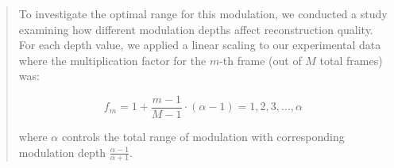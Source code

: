 \documentclass[12pt]{article}
\newenvironment{ourresponse}
    {\begin{tcolorbox}[width=\linewidth,breakable,enhanced,colback=gray!5,colframe=responsecolor!50,title=Response,left=5pt,right=5pt]}
    {\end{tcolorbox}}
\begin{document}
\begin{enumerate}[label=\arabic*.]
\begin{ourresponse}
\begin{quote}
To investigate the optimal range for this modulation, we conducted a study examining how different modulation depths affect reconstruction quality. For each depth value, we applied a linear scaling to our experimental data where the multiplication factor for the $m$-th frame (out of $M$ total frames) was:

\begin{equation}
    f_m = 1 + \frac{m-1}{M-1} \cdot (\alpha -1) = 1, 2, 3, ..., \alpha
\end{equation}

where $\alpha$ controls the total range of modulation with corresponding modulation depth $\frac{\alpha-1}{\alpha+1}$.

\end{quote}
\end{ourresponse}
\end{enumerate}
\end{document}
